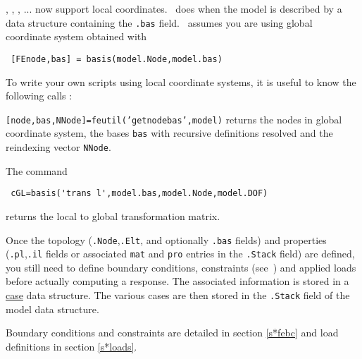 \feplot, \femk, \rigid, ... now support local coordinates. \feutil\ does when the model is described by a data structure containing the {\tt .bas} field. \femesh\ assumes you are using global coordinate system obtained with

\begin{verbatim}
 [FEnode,bas] = basis(model.Node,model.bas)
\end{verbatim}

To write your own scripts using local coordinate systems, it is useful to know the following  calls  :

{\tt [node,bas,NNode]=feutil('getnodebas',model)} returns the nodes in global coordinate system, the bases {\tt bas} with recursive definitions resolved and the reindexing vector {\tt NNode}. 

The command
\begin{verbatim}
 cGL=basis('trans l',model.bas,model.Node,model.DOF)
\end{verbatim}

returns the local to global transformation matrix.

\newpage

Once the topology ({\tt .Node},{\tt .Elt}, and optionally {\tt .bas} fields) and properties ({\tt .pl},{\tt .il} fields or associated {\tt mat} and {\tt pro} entries in the {\tt .Stack} field) are defined, you still need to define boundary conditions, constraints (see~) and applied loads before actually computing a response. The associated information is stored in a \hyperlink{stackref}{case} data structure. The various cases are then stored in the {\tt .Stack} field of the model data structure.

Boundary conditions and constraints are detailed in section \ref{s*febc} and load definitions in section \ref{s*loads}.


